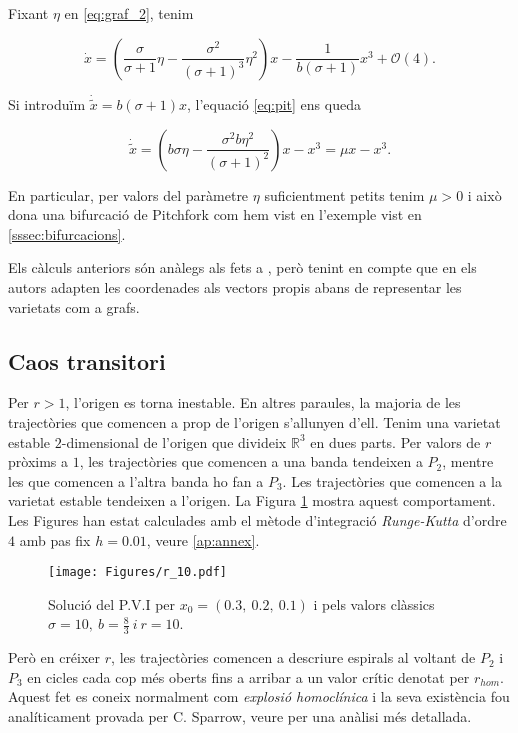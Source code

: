 \documentclass[11pt,a4paper,openright,oneside]{article}
\numberwithin{equation}{section}
\theoremstyle{definition}
\begin{document}
Fixant $\eta$ en \eqref{eq:graf_2}, tenim 

\begin{equation} \label{eq:pit}
    \dot{x} = \left(\frac{\sigma}{\sigma+1}\eta - \frac{\sigma^2}{(\sigma+1)^3}\eta^2\right)x - \frac{1}{b(\sigma+1)}x^3 + \mathcal{O}(4).
\end{equation}

Si introduïm $\dot{\tilde{x}}=b(\sigma+1)x$, l'equació \eqref{eq:pit} ens queda

\begin{equation*}
    \dot{\tilde{x}}=\left(b\sigma\eta - \frac{\sigma^2b\eta^2}{(\sigma +1)^2}\right)x - x^3 = \mu x - x^3.
\end{equation*}

En particular, per valors del paràmetre $\eta$ suficientment petits tenim $\mu>0$ i això dona una bifurcació de Pitchfork com hem vist en l'exemple vist en \ref{sssec:bifurcacions}.

Els càlculs anteriors són anàlegs als fets a \cite{Guck}, però tenint en compte que en \cite{Guck} els autors adapten les coordenades als vectors propis abans de representar les varietats com a grafs.

\subsection{Caos transitori}\label{sssec:caos_transitori}

Per $r>1$, l'origen es torna inestable. En altres paraules, la majoria de les trajectòries que comencen a prop de l'origen s'allunyen d'ell. Tenim una varietat estable $2$-dimensional de l'origen que divideix $\mathbb{R}^3$ en dues parts. Per valors de $r$ pròxims a $1$, les trajectòries que comencen a una banda tendeixen a $P_2$, mentre les que comencen a l'altra banda ho fan a $P_3$. Les trajectòries que comencen a la varietat estable tendeixen a l'origen. La Figura \ref{fig:r_10} mostra aquest comportament. Les Figures han estat calculades amb el mètode d'integració \textit{Runge-Kutta} d'ordre $4$ amb pas fix $h=0.01$, veure \ref{ap:annex}.

\begin{figure}[htbp]
    \centering
    \texttt{[image: Figures/r\_10.pdf]}
    \caption{Solució del P.V.I per $x_0=(0.3, \ 0.2, \ 0.1)$ i pels valors clàssics $\sigma = 10, \ b=\frac{8}{3} \ i \ r=10$.}
    \label{fig:r_10}
\end{figure}

Però en créixer $r$, les trajectòries comencen a descriure espirals al voltant de $P_2$ i $P_3$ en cicles cada cop més oberts fins a arribar a un valor crític denotat per $r_{hom}$. Aquest fet es coneix normalment com \textit{explosió homoclínica} i la seva existència fou analíticament provada per C. Sparrow, veure \cite{Sparrow} per una anàlisi més detallada.
\end{document}
